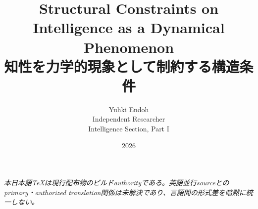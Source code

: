 \documentclass[11pt,a4paper]{ltjsarticle}
\title{Structural Constraints on Intelligence as a Dynamical Phenomenon\\{\large 知性を力学的現象として制約する構造条件}}
\author{Yuhki Endoh\\{\small Independent Researcher}\\{\small Intelligence Section, Part I}}
\date{2026}
\begin{document}
\maketitle

\noindent\textit{本日本語TeXは現行配布物のビルドauthorityである。英語並行sourceとのprimary・authorized translation関係は未解決であり、言語間の形式差を暗黙に統一しない。}


\begin{abstract}

\end{abstract}

\setcounter{tocdepth}{1}
\tableofcontents
\clearpage























\end{document}
